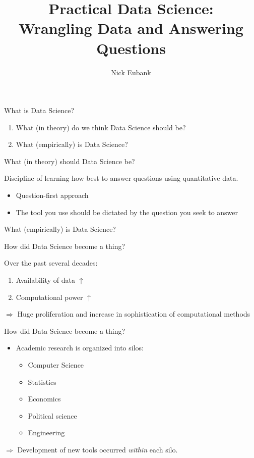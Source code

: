 \documentclass[11pt]{beamer}
\title{Practical Data Science: \\ Wrangling Data and Answering Questions}
\author{\small Nick Eubank}
\date{\vspace*{.3in} \date}
\begin{document}
\begin{frame}
\maketitle
\end{frame}


\begin{frame}[c]{What is Data Science?}
\begin{enumerate}
	\pause \item What (\alert{in theory}) do we think Data Science should be?
	\pause \item What (\alert{empirically}) is Data Science?
\end{enumerate}
\end{frame}


\begin{frame}[c]{What (in theory) should Data Science be?}

\pause Discipline of learning how best to \alert{answer questions} using \alert{quantitative data.}

\pause
\begin{itemize}
	\item Question-first approach \\
	\pause \item The tool you use should be dictated by the question you seek to answer
\end{itemize}

\end{frame}

\begin{frame}[c]{What (empirically) is Data Science?}

\end{frame}

\begin{frame}[c]{How did Data Science become a thing?}

Over the past several decades:
\begin{enumerate}
	\item Availability of data $\uparrow$
	\item Computational power $\uparrow$
\end{enumerate}
\pause
$\Rightarrow$ Huge proliferation and increase in sophistication of computational methods
\end{frame}


\begin{frame}[c]{How did Data Science become a thing?}

\begin{itemize}
	\item Academic research is organized into silos:
	\pause
	\begin{itemize}
		\item Computer Science
		\item Statistics
		\item Economics
		\item Political science
		\item Engineering
	\end{itemize}
\end{itemize}
\pause $\Rightarrow$ Development of new tools occurred \emph{within} each silo.
\end{frame}
\end{document}
